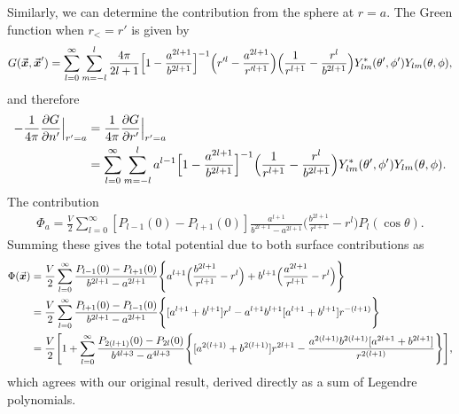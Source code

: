 {Similarly, we can determine the contribution from the sphere at $r = a$.
The Green function when $r_{<} = r'$ is given by
\begin{eqnarray}
    G(\va*{x},\va*{x}') = \sum_{l=0}^{\infty} \sum_{m=-l}^{l} \frac{4\pi}{2l+1} \Big[ 1 - \frac{a^{2l+1}}{b^{2l+1}} \Big]^{-1} \Big( r'^{l} - \frac{a^{2l+1}}{r'^{l+1}} \Big) \Big( \frac{1}{r^{l+1}} - \frac{r^{l}}{b^{2l+1}} \Big) Y_{lm}^{*}(\theta',\phi') Y_{lm}(\theta,\phi)
,\end{eqnarray}
and therefore
\begin{eqnarray}
\begin{aligned}
    -\frac{1}{4\pi} \pdv{G}{n'}\Big|_{r'=a} &= \frac{1}{4\pi} \pdv{G}{r'}\Big|_{r'=a} \\
                                            &= \sum_{l=0}^{\infty} \sum_{m=-l}^{l} a^{l-1} \Big[ 1 - \frac{a^{2l+1}}{b^{2l+1}} \Big]^{-1} \Big( \frac{1}{r^{l+1}} - \frac{r^{l}}{b^{2l+1}} \Big) Y_{lm}^{*}(\theta',\phi') Y_{lm}(\theta,\phi)
.\end{aligned}
\end{eqnarray}
The contribution
\begin{eqnarray}
    \Phi_{a} = \frac{V}{2} \sum_{l=0}^{\infty} [ P_{l-1}(0) - P_{l+1}(0) ] \frac{a^{l+1}}{b^{2l+1} - a^{2l+1}} \Big( \frac{b^{2l+1}}{r^{l+1}} - r^{l} \Big) P_{l}(\cos{\theta})
.\end{eqnarray}
Summing these gives the total potential due to both surface contributions as
\begin{eqnarray}
\begin{aligned}
    \Phi(\va*{x}) &= \frac{V}{2} \sum_{l=0}^{\infty} \frac{P_{l-1}(0) - P_{l+1}(0)}{b^{2l+1} - a^{2l+1}} \Bigg\{ a^{l+1} \Big( \frac{b^{2l+1}}{r^{l+1}} - r^{l} \Big) + b^{l+1} \Big( \frac{a^{2l+1}}{r^{l+1}} - r^{l} \Big) \Bigg\} \\
                  &= \frac{V}{2} \sum_{l=0}^{\infty} \frac{P_{l+1}(0) - P_{l-1}(0)}{b^{2l+1} - a^{2l+1}} \Bigg\{ [a^{l+1} + b^{l+1}] r^{l} - a^{l+1} b^{l+1} [a^{l+1} + b^{l+1}] r^{-(l+1)} \Bigg\} \\
                  &= \frac{V}{2} \Bigg[ 1 + \sum_{l=0}^{\infty} \frac{P_{2(l+1)}(0) - P_{2l}(0)}{b^{4l+3} - a^{4l+3}} \Bigg\{ [a^{2(l+1)} + b^{2(l+1)}] r^{2l+1} - \frac{a^{2(l+1)} b^{2(l+1)} [a^{2l+1} + b^{2l+1}]}{r^{2(l+1)}} \Bigg\} \Bigg]
,\end{aligned}
\end{eqnarray}
which agrees with our original result, derived directly as a sum of Legendre polynomials.

}


